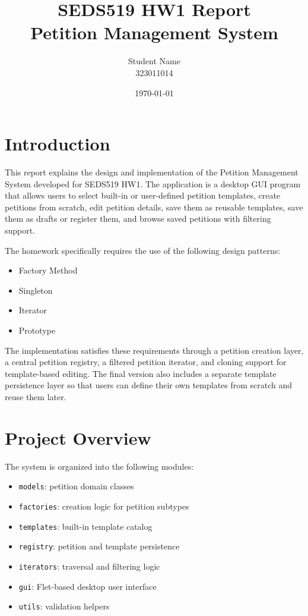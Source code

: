 \documentclass[11pt,a4paper]{article}
\title{SEDS519 HW1 Report\\Petition Management System}
\author{Student Name \\ 323011014}
\date{\today}
\begin{document}
\maketitle

\section{Introduction}

This report explains the design and implementation of the Petition Management
System developed for SEDS519 HW1. The application is a desktop GUI program that
allows users to select built-in or user-defined petition templates, create
petitions from scratch, edit petition details, save them as reusable templates,
save them as drafts or register them, and browse saved petitions with filtering
support.

The homework specifically requires the use of the following design patterns:
\begin{itemize}[leftmargin=1.5em]
    \item Factory Method
    \item Singleton
    \item Iterator
    \item Prototype
\end{itemize}

The implementation satisfies these requirements through a petition creation
layer, a central petition registry, a filtered petition iterator, and cloning
support for template-based editing. The final version also includes a separate
template persistence layer so that users can define their own templates from
scratch and reuse them later.

\section{Project Overview}

The system is organized into the following modules:
\begin{itemize}[leftmargin=1.5em]
    \item \texttt{models}: petition domain classes
    \item \texttt{factories}: creation logic for petition subtypes
    \item \texttt{templates}: built-in template catalog
    \item \texttt{registry}: petition and template persistence
    \item \texttt{iterators}: traversal and filtering logic
    \item \texttt{gui}: Flet-based desktop user interface
    \item \texttt{utils}: validation helpers
\end{itemize}
\end{document}
